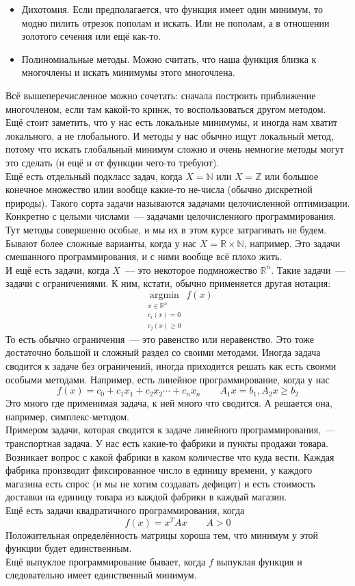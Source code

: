 \documentclass{article}
\begin{document}
    \begin{itemize}
        \item Дихотомия. Если предполагается, что функция имеет один минимум, то модно пилить отрезок пополам и искать. Или не пополам, а в отношении золотого сечения или ещё как-то.
        \item Полиномиальные методы. Можно считать, что наша функция близка к многочлены и искать минимумы этого многочлена.
    \end{itemize}
    Всё вышеперечисленное можно сочетать: сначала построить приближение многочленом, если там какой-то кринж, то воспользоваться другом методом.\\
    Ещё стоит заметить, что у нас есть локальные минимумы, и иногда нам хватит локального, а не глобального. И методы у нас обычно ищут локальный метод, потому что искать глобальный минимум сложно и очень немногие методы могут это сделать (и ещё и от функции чего-то требуют).\\
    Ещё есть отдельный подкласс задач, когда $X=\mathbb N$ или $X=\mathbb Z$ или большое конечное множество илии вообще какие-то не-числа (обычно дискретной природы). Такого сорта задачи называются задачами целочисленной оптимизации. Конкретно с целыми числами~--- задачами целочисленного программирования. Тут методы совершенно особые, и мы их в этом курсе затрагивать не будем.\\
    Бывают более сложные варианты, когда у нас $X=\mathbb R\times\mathbb N$, например. Это задачи смешанного программирования, и с ними вообще всё плохо жить.\\
    И ещё есть задачи, когда $X$~--- это некоторое подмножество $\mathbb R^n$. Такие задачи~--- задачи с ограничениями. К ним, кстати, обычно применяется другая нотация:
    $$
    \operatorname*{argmin}_{\substack{x\in\mathbb R^n\\c_i(x)=0\\c_j(x)\geqslant0}}f(x)
    $$
    То есть обычно ограничения~--- это равенство или неравенство. Это тоже достаточно большой и сложный раздел со своими методами. Иногда задача сводится к задаче без ограничений, иногда приходится решать как есть своими особыми методами. Например, есть линейное программирование, когда у нас
    $$
    f(x)=c_0+c_1x_1+c_2x_2\cdots+c_nx_n\qquad A_1x=b_1,A_2x\geqslant b_2
    $$
    Это много где применимая задача, к ней много что сводится. А решается она, например, симплекс-методом.\\
    Примером задачи, которая сводится к задаче линейного программирования,~--- транспортная задача. У нас есть какие-то фабрики и пункты продажи товара. Возникает вопрос с какой фабрики в каком количестве что куда вести. Каждая фабрика производит фиксированное число в единицу времени, у каждого магазина есть спрос (и мы не хотим создавать дефицит) и есть стоимость доставки на единицу товара из каждой фабрики в каждый магазин.\\
    Ещё есть задачи квадратичного программирования, когда
    $$
    f(x)=x^TAx\qquad A>0
    $$
    Положительная определённость матрицы хороша тем, что минимум у этой функции будет единственным.\\
    Ещё выпуклое программирование бывает, когда $f$ выпуклая функция и следовательно имеет единственный минимум.
\end{document}
